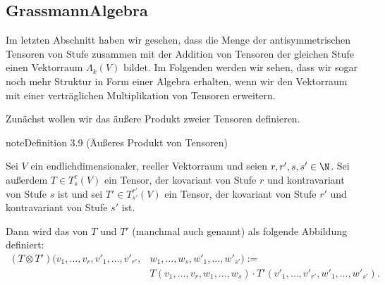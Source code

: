 \documentclass[letterpaper,10pt,german]{jupyterBook}
\begin{document}
\subsection{Grassmann\sphinxhyphen{}Algebra}
\label{\detokenize{vektoranalysis/tensor:grassmann-algebra}}\label{\detokenize{vektoranalysis/tensor:s-grass}}
\sphinxAtStartPar
Im letzten Abschnitt haben wir gesehen, dass die Menge der antisymmetrischen Tensoren von Stufe zusammen mit der Addition von Tensoren der gleichen Stufe einen Vektorraum \(\Lambda_k(V)\) bildet.
Im Folgenden werden wir sehen, dass wir sogar noch mehr Struktur in Form einer Algebra erhalten, wenn wir den Vektorraum mit einer verträglichen Multiplikation von Tensoren erweitern.

\sphinxAtStartPar
Zunächst wollen wir das äußere Produkt zweier Tensoren definieren.
\label{vektoranalysis/tensor:def:aeusseresProduktTensoren}
\begin{sphinxadmonition}{note}{Definition 3.9 (Äußeres Produkt von Tensoren)}



\sphinxAtStartPar
Sei \(V\) ein endlich\sphinxhyphen{}dimensionaler, reeller Vektorraum und seien \(r,r',s,s' \in \N\).
Sei außerdem \(T \in T^r_s(V)\) ein Tensor, der kovariant von Stufe \(r\) und kontravariant von Stufe \(s\) ist und sei \(T' \in T^{r'}_{s'}(V)\) ein Tensor, der kovariant von Stufe \(r'\) und kontravariant von Stufe \(s'\) ist.

\sphinxAtStartPar
Dann wird das  von \(T\) und \(T'\) (manchmal auch  genannt) als folgende Abbildung definiert:
\begin{equation*}
\begin{split}(T \otimes T')(v_1,\ldots,v_r,v'_1,\ldots,v'_{r'},&w_1,\ldots,w_s,w'_1,\ldots,w'_{s'}) := \\
&T(v_1,\ldots,v_r,w_1,\ldots,w_s)\cdot T'(v'_1,\ldots,v'_{r'},w'_1,\ldots,w'_{s'}).\end{split}
\end{equation*}\end{sphinxadmonition}
\end{document}
